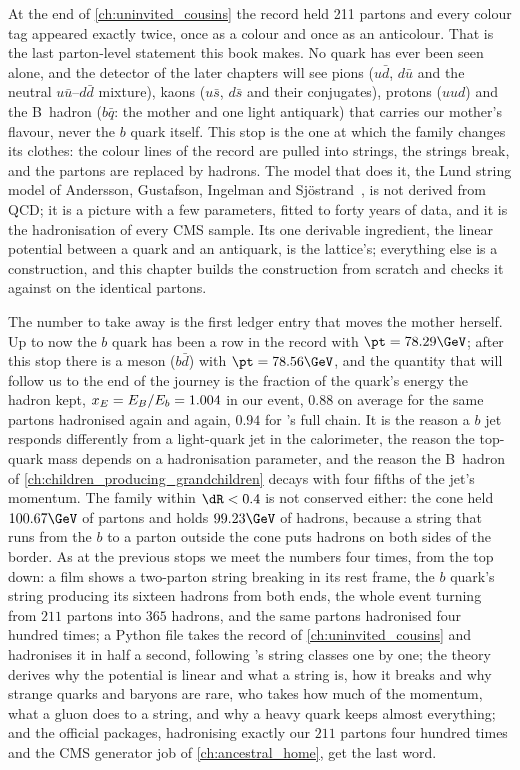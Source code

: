 At the end of \cref{ch:uninvited_cousins} the record held 211 partons and
every colour tag appeared exactly twice, once as a colour and once as an
anticolour. That is the last parton-level statement this book makes. No
quark has ever been seen alone, and the detector of the later chapters will
see pions ($u\bar d$, $d\bar u$ and the neutral $u\bar u$--$d\bar d$ mixture),
kaons ($u\bar s$, $d\bar s$ and their conjugates), protons ($uud$) and the
B~hadron ($b\bar q$: the mother and one light antiquark) that carries our
mother's flavour, never the $b$ quark itself. This stop is the one at which the
family changes its clothes: the colour lines of the record are pulled into
strings, the strings break, and the partons are replaced by hadrons. The
model that does it, the Lund string model of Andersson, Gustafson, Ingelman
and Sj\"ostrand~\cite{Andersson:1983ia}, is not derived from QCD; it is a
picture with a few parameters, fitted to forty years of data, and it is the
hadronisation of every CMS sample. Its one derivable ingredient, the linear
potential between a quark and an antiquark, is the lattice's; everything
else is a construction, and this chapter builds the construction from
scratch and checks it against \PYTHIA on the identical partons.

The number to take away is the first ledger entry that moves the mother
herself. Up to now the $b$ quark has been a row in the record with
$\pt=78.29\GeV$; after this stop there is a \Bstarbar meson ($b\bar d$) with
$\pt=78.56\GeV$, and the quantity that will follow us to the end of the
journey is the fraction of the quark's energy the hadron kept,
$x_E=E_B/E_b=1.004$ in our event, $0.88$ on average for the same partons
hadronised again and again, $0.94$ for \PYTHIA's full chain. It is the
reason a $b$ jet responds differently from a light-quark jet in the
calorimeter, the reason the top-quark mass depends on a hadronisation
parameter, and the reason the B~hadron of \cref{ch:children_producing_grandchildren}
decays with four fifths of the jet's momentum. The family within $\dR<0.4$
is not conserved either: the cone held $100.67\GeV$ of partons and holds
$99.23\GeV$ of hadrons, because a string that runs from the $b$ to a parton
outside the cone puts hadrons on both sides of the border. As at the
previous stops we meet the numbers four times, from the top down: a film
shows a two-parton string breaking in its rest frame, the $b$ quark's
string producing its sixteen hadrons from both ends, the whole event
turning from $211$ partons into $365$ hadrons, and the same partons
hadronised four hundred times; a Python file takes the record of
\cref{ch:uninvited_cousins} and hadronises it in half a second, following
\PYTHIA's string classes one by one; the theory derives why the potential
is linear and what a string is, how it breaks and why strange quarks and
baryons are rare, who takes how much of the momentum, what a gluon does to
a string, and why a heavy quark keeps almost everything; and the official
packages, \PYTHIA hadronising exactly our $211$ partons four hundred times
and the CMS generator job of \cref{ch:ancestral_home}, get the last word.

